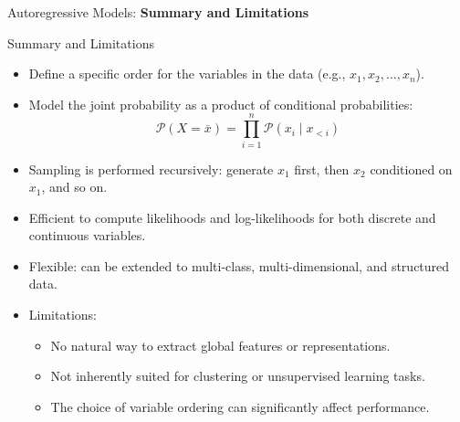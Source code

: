 \begin{frame}{}
    \centering
    \LARGE Autoregressive Models: \textbf{Summary and Limitations}
\end{frame}

\begin{frame}[allowframebreaks]{Summary and Limitations}
    \begin{itemize}
        \item Define a specific order for the variables in the data (e.g., $x_1, x_2, \ldots, x_n$).
        \item Model the joint probability as a product of conditional probabilities: 
        \[
            \mathcal{P}(X = \overline{x}) = \prod_{i=1}^n \mathcal{P}(x_i \mid x_{<i})
        \]
        \item Sampling is performed recursively: generate $x_1$ first, then $x_2$ conditioned on $x_1$, and so on.
        \item Efficient to compute likelihoods and log-likelihoods for both discrete and continuous variables.
        \item Flexible: can be extended to multi-class, multi-dimensional, and structured data.
        \framebreak
        \item Limitations:
        \begin{itemize}
            \item No natural way to extract global features or representations.
            \item Not inherently suited for clustering or unsupervised learning tasks.
            \item The choice of variable ordering can significantly affect performance.
        \end{itemize}
    \end{itemize}
\end{frame}
